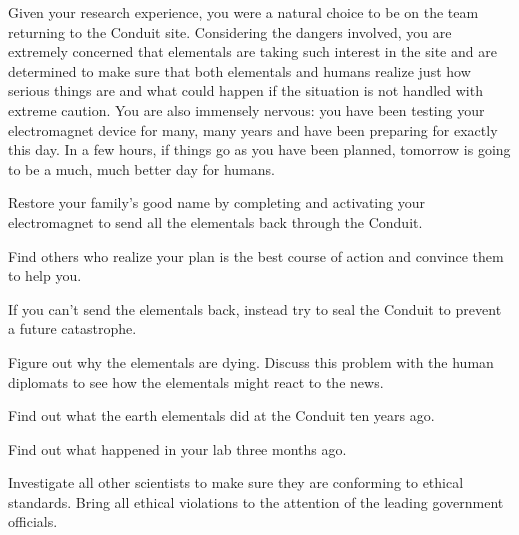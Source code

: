 \documentclass[char]{guildcamp1}
\begin{document}
Given your research experience, you were a natural choice to be on the team returning to the Conduit site. Considering the dangers involved, you are extremely concerned that elementals are taking such interest in the site and are determined to make sure that both elementals and humans realize just how serious things are and what could happen if the situation is not handled with extreme caution. You are also immensely nervous: you have been testing your electromagnet device for many, many years and have been preparing for exactly this day. In a few hours, if things go as you have been planned, tomorrow is going to be a much, much better day for humans.


\begin{itemz}[Goals]
  \item Restore your family's good name by completing and activating your electromagnet to send all the elementals back through the Conduit.
  \item Find others who realize your plan is the best course of action and convince them to help you. %
  \item If you can't send the elementals back, instead try to seal the Conduit to prevent a future catastrophe.
  \item Figure out why the elementals are dying. Discuss this problem with the human diplomats to see how the elementals might react to the news.
  \item Find out what the earth elementals did at the Conduit ten years ago.
  \item Find out what happened in your lab three months ago.
  \item Investigate all other scientists to make sure they are conforming to ethical standards. Bring all ethical violations to the attention of the leading government officials.
\end{itemz}
\end{document}
